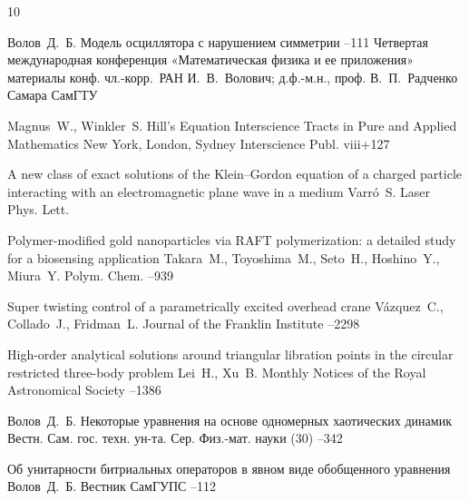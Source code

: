 \begin{thebibliography}{10}

\by  Волов~Д.~Б. 
\paper Модель осциллятора с нарушением симметрии
--111
\inbook Четвертая международная конференция «Математическая физика и ее приложения»
\bookinfo материалы конф. 
\eds чл.-корр.~РАН И.~В.~Волович; д.ф.-м.н., проф. В.~П.~Радченко
\publaddr Самара
\publ СамГТУ


\by Magnus~W., Winkler~S.
\book Hill's Equation
\serial Interscience Tracts in Pure and Applied Mathematics
\publaddr New York, London, Sydney
\publ Interscience Publ.
\totalpages viii+127


\paper A new class of exact solutions of the Klein–Gordon equation of a charged particle interacting with an electromagnetic plane wave in a medium
\by Varr\'{o}~S.
\jour Laser Phys. Lett.


\paper Polymer-modified gold nanoparticles via RAFT polymerization: a detailed study for a biosensing application
\by Takara~M., Toyoshima~M., Seto~H., Hoshino~Y., Miura~Y.
\jour Polym. Chem.
--939

\paper Super twisting control of a parametrically excited overhead crane
\by V\'{a}zquez~C., Collado~J., Fridman~L.
\jour Journal of the Franklin Institute
--2298


\paper High-order analytical solutions around triangular libration points in the circular restricted three-body
problem
\by Lei~H., Xu~B.
\jour Monthly Notices of the Royal Astronomical Society
--1386


\by Волов~Д.~Б.
\paper Некоторые уравнения на основе одномерных хаотических динамик
\jour Вестн. Сам. гос. техн. ун-та. Сер. Физ.-мат. науки
(30)
--342


\paper Об унитарности битриальных операторов в явном виде обобщенного уравнения
\by Волов~Д.~Б.
\jour Вестник СамГУПС
--112



\end{thebibliography}
